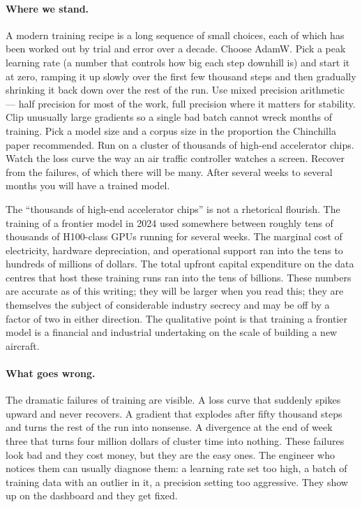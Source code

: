 \paragraph{Where we stand.} A modern training recipe is a long sequence of small choices,
each of which has been worked out by trial and error over a
decade. Choose AdamW. Pick a peak learning rate (a number that
controls how big each step downhill is) and start it at zero,
ramping it up slowly over the first few thousand steps and then
gradually shrinking it back down over the rest of the run. Use
mixed precision arithmetic --- half precision for most of the
work, full precision where it matters for stability. Clip
unusually large gradients so a single bad batch cannot wreck
months of training. Pick a model size and a corpus size in the
proportion the Chinchilla paper recommended. Run on a cluster of
thousands of high-end accelerator chips. Watch the loss curve
the way an air traffic controller watches a screen. Recover
from the failures, of which there will be many. After several
weeks to several months you will have a trained model.

The ``thousands of high-end accelerator chips'' is not a
rhetorical flourish. The training of a frontier model in
2024 used somewhere between roughly tens of thousands of
H100-class GPUs running for several weeks. The marginal cost
of electricity, hardware depreciation, and operational support
ran into the tens to hundreds of millions of dollars. The
total upfront capital expenditure on the data centres that
host these training runs ran into the tens of billions. These
numbers are accurate as of this writing; they will be larger
when you read this; they are themselves the subject of
considerable industry secrecy and may be off by a factor of
two in either direction. The qualitative point is that
training a frontier model is a financial and industrial
undertaking on the scale of building a new aircraft.

\paragraph{What goes wrong.} The dramatic failures of training are visible. A loss curve that
suddenly spikes upward and never recovers. A gradient that
explodes after fifty thousand steps and turns the rest of the
run into nonsense. A divergence at the end of week three that
turns four million dollars of cluster time into nothing. These
failures look bad and they cost money, but they are the easy
ones. The engineer who notices them can usually diagnose them:
a learning rate set too high, a batch of training data with an
outlier in it, a precision setting too aggressive. They show up
on the dashboard and they get fixed.


